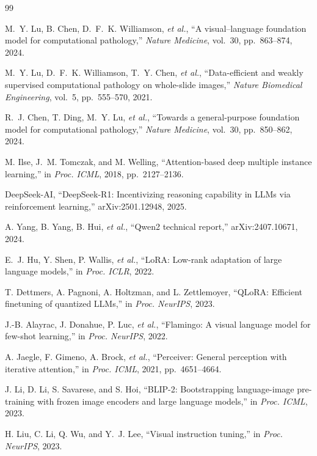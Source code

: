 \documentclass[11pt]{article}
\begin{document}
\begin{thebibliography}{99}
\setlength{\itemsep}{2pt}

M.~Y. Lu, B. Chen, D.~F.~K. Williamson, \emph{et al.},
``A visual--language foundation model for computational pathology,''
\emph{Nature Medicine}, vol.~30, pp.~863--874, 2024.

M.~Y. Lu, D.~F.~K. Williamson, T.~Y. Chen, \emph{et al.},
``Data-efficient and weakly supervised computational pathology on whole-slide
images,'' \emph{Nature Biomedical Engineering}, vol.~5, pp.~555--570, 2021.

R.~J. Chen, T. Ding, M.~Y. Lu, \emph{et al.},
``Towards a general-purpose foundation model for computational pathology,''
\emph{Nature Medicine}, vol.~30, pp.~850--862, 2024.

M. Ilse, J.~M. Tomczak, and M. Welling,
``Attention-based deep multiple instance learning,''
in \emph{Proc. ICML}, 2018, pp.~2127--2136.

DeepSeek-AI,
``DeepSeek-R1: Incentivizing reasoning capability in LLMs via reinforcement
learning,'' arXiv:2501.12948, 2025.

A. Yang, B. Yang, B. Hui, \emph{et al.},
``Qwen2 technical report,'' arXiv:2407.10671, 2024.

E.~J. Hu, Y. Shen, P. Wallis, \emph{et al.},
``LoRA: Low-rank adaptation of large language models,''
in \emph{Proc. ICLR}, 2022.

T. Dettmers, A. Pagnoni, A. Holtzman, and L. Zettlemoyer,
``QLoRA: Efficient finetuning of quantized LLMs,''
in \emph{Proc. NeurIPS}, 2023.

J.-B. Alayrac, J. Donahue, P. Luc, \emph{et al.},
``Flamingo: A visual language model for few-shot learning,''
in \emph{Proc. NeurIPS}, 2022.

A. Jaegle, F. Gimeno, A. Brock, \emph{et al.},
``Perceiver: General perception with iterative attention,''
in \emph{Proc. ICML}, 2021, pp.~4651--4664.

J. Li, D. Li, S. Savarese, and S. Hoi,
``BLIP-2: Bootstrapping language-image pre-training with frozen image encoders
and large language models,'' in \emph{Proc. ICML}, 2023.

H. Liu, C. Li, Q. Wu, and Y.~J. Lee,
``Visual instruction tuning,'' in \emph{Proc. NeurIPS}, 2023.


\end{thebibliography}
\end{document}
